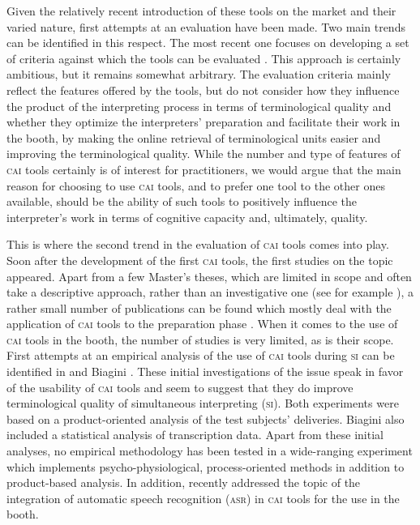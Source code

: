 \documentclass[output=paper]{langsci/langscibook}
\begin{document}
Given the relatively recent introduction of these tools on the market and their varied nature, first attempts at an evaluation have been made. Two main trends can be identified in this respect. The most recent one focuses on developing a set of criteria against which the tools can be evaluated \citep{Costa2016, Will2015}. This approach is certainly ambitious, but it remains somewhat arbitrary. The evaluation criteria mainly reflect the features offered by the tools, but do not consider how they influence the product of the interpreting process in terms of terminological quality and whether they optimize the interpreters’ preparation and facilitate their work in the booth, by making the online retrieval of terminological units easier and improving the terminological quality. While the number and type of features of \textsc{cai} tools certainly is of interest for practitioners, we would argue that the main reason for choosing to use \textsc{cai} tools, and to prefer one tool to the other ones available, should be the ability of such tools to positively influence the interpreter’s work in terms of cognitive capacity and, ultimately, quality. 

This is where the second trend in the evaluation of \textsc{cai} tools comes into play. Soon after the development of the first \textsc{cai} tools, the first studies on the topic appeared. Apart from a few Master’s theses, which are limited in scope and often take a descriptive approach, rather than an investigative one (see for example \citealt{DeMerulis2013}), a rather small number of publications can be found which mostly deal with the application of \textsc{cai} tools to the preparation phase \citep{Xu2015, Fantinuoli2017a}. When it comes to the use of \textsc{cai} tools in the booth, the number of studies is very limited, as is their scope. First attempts at an empirical analysis of the use of \textsc{cai} tools during \textsc{si} can be identified in \citet{Prandi2015a, Prandi2015b} and Biagini \citet{Biagini2015}. These initial investigations of the issue speak in favor of the usability of \textsc{cai} tools and seem to suggest that they do improve terminological quality of simultaneous interpreting (\textsc{si}). Both experiments were based on a product-oriented analysis of the test subjects’ deliveries. Biagini also included a statistical analysis of transcription data. Apart from these initial analyses, no empirical methodology has been tested in a wide-ranging experiment which implements psycho-physiological, process-oriented methods in addition to product-based analysis. In addition, \citet{Fantinuoli2017b} recently addressed the topic of the integration of automatic speech recognition (\textsc{asr}) in \textsc{cai} tools for the use in the booth.
\end{document}
